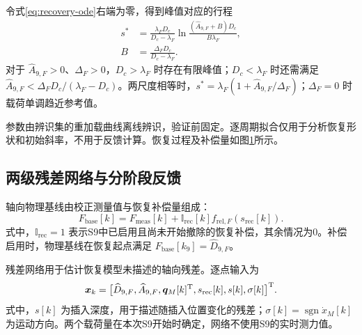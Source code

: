 \documentclass{JQR_LaTeX_Template-0507/JQRnew}
\begin{document}
令式\eqref{eq:recovery-ode}右端为零，得到峰值对应的行程
\begin{equation}
\label{eq:peak-location}
\begin{aligned}
s^*&=\frac{\lambda_FD_c}{D_c-\lambda_F}
\ln\frac{(\widehat A_{9,F}+B)D_c}{B\lambda_F},\\
B&=\frac{\Delta_FD_c}{D_c-\lambda_F}.
\end{aligned}
\end{equation}
对于 $\widehat A_{9,F}>0$、$\Delta_F>0$，$D_c>\lambda_F$ 时存在有限峰值；$D_c<\lambda_F$ 时还需满足 $\widehat A_{9,F}<\Delta_FD_c/(\lambda_F-D_c)$。两尺度相等时，$s^*=\lambda_F(1+\widehat A_{9,F}/\Delta_F)$；$\Delta_F=0$ 时载荷单调趋近参考值。

参数由辨识集的重加载曲线离线辨识，验证前固定。逐周期拟合仅用于分析恢复形状和初始斜率，不用于反馈计算。恢复过程及补偿量如图\ref{fig3}所示。

\begin{figure}[H]
\centering
{}
\label{fig3}
\end{figure}

\subsection{两级残差网络与分阶段反馈}

轴向物理基线由校正测量值与恢复补偿量组成：
\begin{equation}
\label{eq:physical-baseline}
F_{\mathrm{base}}[k]=F_{\mathrm{meas}}[k]
+\mathbb I_{\mathrm{rec}}[k]f_{\mathrm{rel},F}(s_{\mathrm{rec}}[k]).
\end{equation}
式中，$\mathbb I_{\mathrm{rec}}=1$ 表示S9中已启用且尚未开始撤除的恢复补偿，其余情况为0。补偿启用时，物理基线在恢复起点满足 $F_{\mathrm{base}}[k_9]=\widehat D_{9,F}$。

残差网络用于估计恢复模型未描述的轴向残差。逐点输入为
\begin{equation}
\label{eq:gru-input}
\bm x_k=\big[\widehat D_{9,F},\widehat A_{9,F},
\bm q_M[k]^{\rm T},s_{\mathrm{rec}}[k],s[k],\sigma[k]\big]^{\rm T}.
\end{equation}
式中，$s[k]$ 为插入深度，用于描述随插入位置变化的残差；$\sigma[k]=\operatorname{sgn}\dot x_M[k]$ 为运动方向。两个载荷量在本次S9开始时确定，网络不使用S9的实时测力值。
\end{document}
